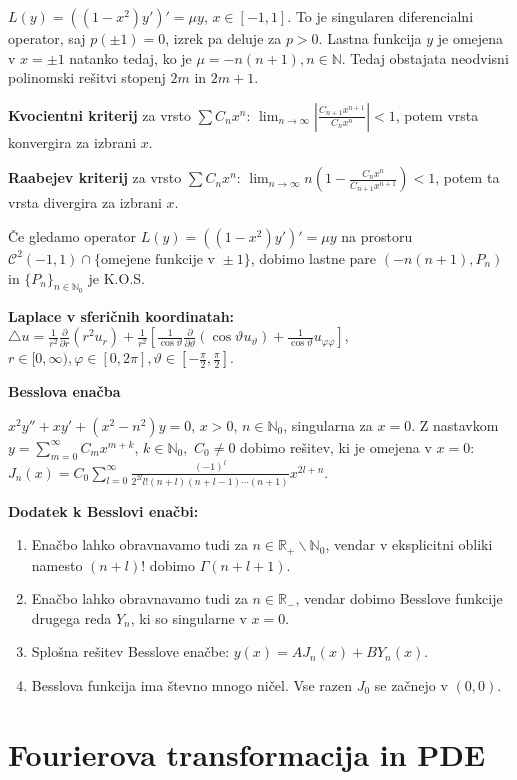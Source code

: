\documentclass[11pt,a4paper]{amsart}
\theoremstyle{definition} %
\theoremstyle{plain} %
\newcommand{\R}{\mathbb R}
\newcommand{\N}{\mathbb N}
\begin{document}
$L(y) = ((1-x^2)y')'=\mu y$, $x \in [-1,1]$. To je singularen diferencialni operator, saj $p(\pm 1) = 0$, izrek pa deluje za $p > 0$. Lastna funkcija $y$ je omejena v $x = \pm 1$ natanko tedaj, ko je $\mu = -n(n+1), n \in \N$. Tedaj obstajata neodvisni polinomski rešitvi stopenj $2m$ in $2m+1$.

\textbf{Kvocientni kriterij} za vrsto $\sum C_n x^n$: $\lim_{n\rightarrow \infty}\left| \frac{C_{n+1} x^{n+1}}{C_n x^{n}}\right| < 1$, potem vrsta konvergira za izbrani $x$.

\textbf{Raabejev kriterij} za vrsto $\sum C_n x^n$: $\lim_{n\rightarrow \infty}n(1-\frac{C_nx^n}{C_{n+1}x^{n+1}}) < 1$, potem ta vrsta divergira za izbrani $x$.

Če gledamo operator $L(y) = ((1-x^2)y')'=\mu y$ na prostoru $\mathcal{C}^2(-1,1) \cap \{\text{omejene funkcije v }\pm1 \}$, dobimo lastne pare $(-n(n+1),P_n)$ in $\{P_n \}_{n \in \N_0}$ je K.O.S.

\textbf{Laplace v sferičnih koordinatah:} $\triangle u = \frac{1}{r^2} \frac{\partial}{\partial r}(r^2u_r) + \frac{1}{r^2}\left[ \frac{1}{\cos \vartheta} \frac{\partial}{\partial \vartheta}(\cos \vartheta u_\vartheta) + \frac{1}{\cos \vartheta} u_{\varphi \varphi} \right]$, $r \in [0,\infty ),\varphi \in [0,2\pi], \vartheta \in [-\frac{\pi}{2}, \frac{\pi}{2}]$.

\textbf{Besslova enačba}

$x^2y''+xy'+(x^2-n^2)y = 0$, $x > 0$, $n \in \N_0$, singularna za $x = 0$. Z nastavkom $y = \sum_{m = 0}^\infty C_m x^{m+k}$, $k \in \N_0,$ $C_0 \neq 0$ dobimo rešitev, ki je omejena v $x = 0$: $J_n(x) = C_0 \sum_{l = 0}^\infty \frac{(-1)^l}{2^{2l}l!(n+l)(n+l-1)\cdots (n+1)}x^{2l + n}$.

\textbf{Dodatek k Besslovi enačbi:}
\begin{enumerate}
\item Enačbo lahko obravnavamo tudi za $n \in \R_+\backslash \N_0$, vendar v eksplicitni obliki namesto $(n+l)!$ dobimo $\Gamma (n+l+1)$.
\item Enačbo lahko obravnavamo tudi za $n \in \R_-$, vendar dobimo Besslove funkcije drugega reda $Y_n$, ki so singularne v $x=0$.
\item Splošna rešitev Besslove enačbe: $y(x) = AJ_n(x) + BY_n(x)$.
\item Besslova funkcija ima števno mnogo ničel. Vse razen $J_0$ se začnejo v $(0,0)$.
\end{enumerate}

\section*{Fourierova transformacija in PDE}
\end{document}
